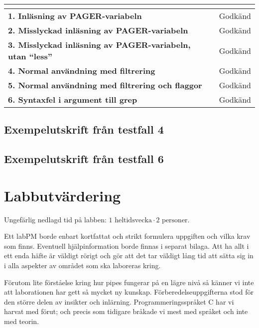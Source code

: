 \documentclass[a4paper,10pt,titlepage]{article}
\begin{document}
\begin{tabularx}{\textwidth}{>{\bfseries}l  X }
	\multicolumn{2}{c}{\large\textbf{Testfallsresultat}} \\[0.1cm]
	\toprule
	1. Inläsning av PAGER-variabeln 							& Godkänd \\
	2. Misslyckad inläsning av PAGER-variabeln					& Godkänd \\
	3. Misslyckad inläsning av PAGER-variabeln, utan ``less''	& Godkänd \\
	4. Normal användning med filtrering 						& Godkänd \\
	5. Normal användning med filtrering och flaggor				& Godkänd \\
	6. Syntaxfel i argument till grep							& Godkänd \\
	\bottomrule
\end{tabularx}

\subsection{Exempelutskrift från testfall 4}



\subsection{Exempelutskrift från testfall 6}



\newpage
\section{Labbutvärdering}

Ungefärlig nedlagd tid på labben: $1 \text{ heltidsvecka} \cdot 2 \text{ personer}$.

Ett labPM borde enbart kortfattat och strikt formulera uppgiften och vilka krav som finns.
Eventuell hjälpinformation borde finnas i separat bilaga. Att ha allt i ett enda häfte är väldigt rörigt och gör att det tar väldigt lång tid att sätta sig in i alla aspekter av området som ska laboreras kring.

Förutom lite förståelse kring hur pipes fungerar på en lägre nivå så känner vi inte att laborationen har gett så mycket ny kunskap. Förberedelseuppgifterna stod för den större delen av insikter och inlärning. Programmeringsspråket C har vi harvat med förut; och precis som tidigare bråkade vi mest med språket och inte med teorin.
\end{document}
